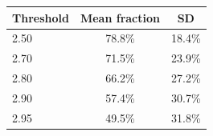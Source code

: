 \begin{tabular}{lcc}
\toprule
Threshold & Mean fraction & SD \\
\midrule
2.50 & 78.8\% & 18.4\% \\
2.70 & 71.5\% & 23.9\% \\
2.80 & 66.2\% & 27.2\% \\
2.90 & 57.4\% & 30.7\% \\
2.95 & 49.5\% & 31.8\% \\
\bottomrule
\end{tabular}
